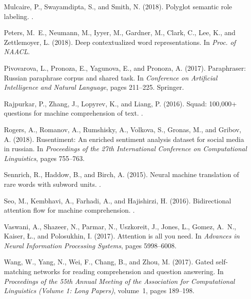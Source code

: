 \documentclass{article}
\begin{document}
\begin{thebibliography}{}
Mulcaire, P., Swayamdipta, S., and Smith, N. (2018).
\newblock Polyglot semantic role labeling.
.

Peters, M.~E., Neumann, M., Iyyer, M., Gardner, M., Clark, C., Lee, K., and
  Zettlemoyer, L. (2018).
\newblock Deep contextualized word representations.
\newblock In {\em Proc. of NAACL}.

Pivovarova, L., Pronoza, E., Yagunova, E., and Pronoza, A. (2017).
\newblock Paraphraser: Russian paraphrase corpus and shared task.
\newblock In {\em Conference on Artificial Intelligence and Natural Language},
  pages 211--225. Springer.

Rajpurkar, P., Zhang, J., Lopyrev, K., and Liang, P. (2016).
\newblock Squad: 100,000+ questions for machine comprehension of text.
.

Rogers, A., Romanov, A., Rumshisky, A., Volkova, S., Gronas, M., and Gribov, A.
  (2018).
\newblock Rusentiment: An enriched sentiment analysis dataset for social media
  in russian.
\newblock In {\em Proceedings of the 27th International Conference on
  Computational Linguistics}, pages 755--763.

Sennrich, R., Haddow, B., and Birch, A. (2015).
\newblock Neural machine translation of rare words with subword units.
.

Seo, M., Kembhavi, A., Farhadi, A., and Hajishirzi, H. (2016).
\newblock Bidirectional attention flow for machine comprehension.
.

Vaswani, A., Shazeer, N., Parmar, N., Uszkoreit, J., Jones, L., Gomez, A.~N.,
  Kaiser, {\L}., and Polosukhin, I. (2017).
\newblock Attention is all you need.
\newblock In {\em Advances in Neural Information Processing Systems}, pages
  5998--6008.

Wang, W., Yang, N., Wei, F., Chang, B., and Zhou, M. (2017).
\newblock Gated self-matching networks for reading comprehension and question
  answering.
\newblock In {\em Proceedings of the 55th Annual Meeting of the Association for
  Computational Linguistics (Volume 1: Long Papers)}, volume~1, pages 189--198.

\end{thebibliography}
 
\end{document}
